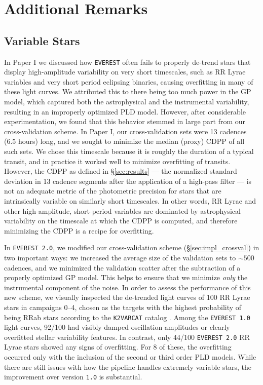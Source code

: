 \documentclass[]{aastex62}
\newcommand{\edited}[1]{{\color{red} #1}}
\begin{document}
\section{Additional Remarks}
\label{sec:remarks}

\subsection{Variable Stars}
\label{sec:variables}
In Paper I we discussed how \texttt{EVEREST} often fails to properly de-trend stars
that \edited{display high-amplitude variability on very short timescales},
such as RR Lyrae variables and very short period eclipsing
binaries, causing overfitting in many of these light curves. We attributed this to
there being too much power in the GP model, which
captured both the astrophysical and the instrumental variability, resulting in an
improperly optimized PLD model. However, after considerable experimentation, we
found that this behavior stemmed in large part from our cross-validation scheme.
In Paper I, our cross-validation sets were 13 cadences (6.5 hours) long, and we sought to
minimize the median (proxy) CDPP of all such sets. We chose this timescale
because it is roughly the duration of a typical transit, and in practice
it worked well to minimize overfitting of transits. However, the CDPP as defined in
\S\ref{sec:results} --- the normalized standard deviation in 13 cadence segments
after the application of a high-pass filter --- is not an adequate metric of the
photometric precision for stars that are intrinsically variable on similarly short
timescales. In other words, RR Lyrae and other \edited{high-amplitude, short-period} variables
are dominated by astrophysical
variability on the timescale at which the CDPP is computed, and therefore
minimizing the CDPP is a recipe for overfitting.

In \texttt{EVEREST 2.0}, we modified our cross-validation scheme (\S\ref{sec:impl_crossval})
in two important ways: we increased the average size of the validation sets to
${\sim}500$ cadences, and we minimized the validation scatter after the subtraction of
a properly optimized GP model. This helps to ensure that we minimize \emph{only} the instrumental
component of the noise. In order to assess the performance of this new scheme, we
visually inspected the de-trended light curves of 100 RR Lyrae stars in campaigns 0--4,
chosen as the targets with the highest probability of being RRab stars
according to the \texttt{K2VARCAT} catalog \citep{Armstrong16}.
Among the \texttt{EVEREST 1.0} light curves, 92/100 had visibly damped
oscillation amplitudes or clearly overfitted stellar variability features. In contrast,
only 44/100 \texttt{EVEREST 2.0} RR Lyrae stars showed any signs of overfitting. For 8
of these, the overfitting occurred only with the inclusion of the second or third order PLD
models. While there are still issues with how the pipeline handles extremely variable
stars, the improvement over version \texttt{1.0} is substantial.
\end{document}
